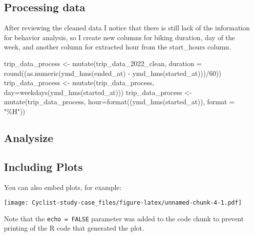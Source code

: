 \documentclass[
]{article}
\newenvironment{Shaded}{\begin{snugshade}}{\end{snugshade}}
\newcommand{\AttributeTok}[1]{\textcolor[rgb]{0.77,0.63,0.00}{#1}}
\newcommand{\DecValTok}[1]{\textcolor[rgb]{0.00,0.00,0.81}{#1}}
\newcommand{\FunctionTok}[1]{\textcolor[rgb]{0.00,0.00,0.00}{#1}}
\newcommand{\NormalTok}[1]{#1}
\newcommand{\OtherTok}[1]{\textcolor[rgb]{0.56,0.35,0.01}{#1}}
\newcommand{\SpecialCharTok}[1]{\textcolor[rgb]{0.00,0.00,0.00}{#1}}
\newcommand{\StringTok}[1]{\textcolor[rgb]{0.31,0.60,0.02}{#1}}
\begin{document}
\hypertarget{processing-data}{%
\subsection{Processing data}\label{processing-data}}

After reviewing the cleaned data I notice that there is still lack of
the information for behavior analysis, so I create new columns for
biking duration, day of the week, and another column for extracted hour
from the start\_hours column.

\begin{Shaded}
\begin{Highlighting}[]
\NormalTok{trip\_data\_process }\OtherTok{\textless{}{-}} \FunctionTok{mutate}\NormalTok{(trip\_data\_2022\_clean, }\AttributeTok{duration =} \FunctionTok{round}\NormalTok{((}\FunctionTok{as.numeric}\NormalTok{(}\FunctionTok{ymd\_hms}\NormalTok{(ended\_at) }\SpecialCharTok{{-}} \FunctionTok{ymd\_hms}\NormalTok{(started\_at)))}\SpecialCharTok{/}\DecValTok{60}\NormalTok{))}
\NormalTok{trip\_data\_process }\OtherTok{\textless{}{-}} \FunctionTok{mutate}\NormalTok{(trip\_data\_process, }\AttributeTok{day=}\FunctionTok{weekdays}\NormalTok{(}\FunctionTok{ymd\_hms}\NormalTok{(started\_at)))}
\NormalTok{trip\_data\_process }\OtherTok{\textless{}{-}} \FunctionTok{mutate}\NormalTok{(trip\_data\_process, }\AttributeTok{hour=}\FunctionTok{format}\NormalTok{((}\FunctionTok{ymd\_hms}\NormalTok{(started\_at)), }\AttributeTok{format =} \StringTok{"\%H"}\NormalTok{))}
\end{Highlighting}
\end{Shaded}

\hypertarget{analysize}{%
\subsection{Analysize}\label{analysize}}

\hypertarget{including-plots}{%
\subsection{Including Plots}\label{including-plots}}

You can also embed plots, for example:

\texttt{[image: Cyclist-study-case\_files/figure-latex/unnamed-chunk-4-1.pdf]}

Note that the \texttt{echo\ =\ FALSE} parameter was added to the code
chunk to prevent printing of the R code that generated the plot.
\end{document}
